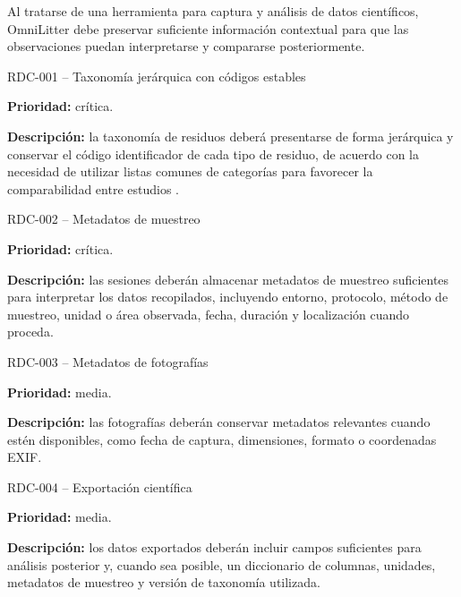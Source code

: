 Al tratarse de una herramienta para captura y análisis de datos científicos,
OmniLitter debe preservar suficiente información contextual para que las
observaciones puedan interpretarse y compararse posteriormente.

\begin{requisitocard}{RDC-001 -- Taxonomía jerárquica con códigos estables}

\textbf{Prioridad:} crítica.

\textbf{Descripción:} la taxonomía de residuos deberá presentarse de forma
jerárquica y conservar el código identificador de cada tipo de residuo, de acuerdo
con la necesidad de utilizar listas comunes de categorías para favorecer la
comparabilidad entre estudios \cite{gonzalez2016riverine}.

\end{requisitocard}

\begin{requisitocard}{RDC-002 -- Metadatos de muestreo}

\textbf{Prioridad:} crítica.

\textbf{Descripción:} las sesiones deberán almacenar metadatos de muestreo
suficientes para interpretar los datos recopilados, incluyendo entorno, protocolo,
método de muestreo, unidad o área observada, fecha, duración y localización cuando
proceda.

\end{requisitocard}

\begin{requisitocard}{RDC-003 -- Metadatos de fotografías}

\textbf{Prioridad:} media.

\textbf{Descripción:} las fotografías deberán conservar metadatos relevantes
cuando estén disponibles, como fecha de captura, dimensiones, formato o
coordenadas EXIF.

\end{requisitocard}

\begin{requisitocard}{RDC-004 -- Exportación científica}

\textbf{Prioridad:} media.

\textbf{Descripción:} los datos exportados deberán incluir campos suficientes para
análisis posterior y, cuando sea posible, un diccionario de columnas, unidades,
metadatos de muestreo y versión de taxonomía utilizada.

\end{requisitocard}


